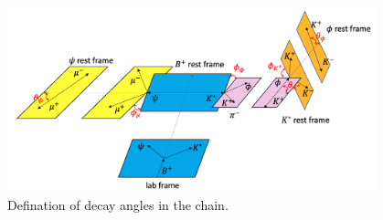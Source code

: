 \begin{figure}[!hbtp]
\centering
\includegraphics[width=0.95\textwidth]{Figures/03_Zcs/05_Likelihood/Cartoon/B2PsiKstar.png}%
\caption{Defination of decay angles in the \Kstar chain.}
\label{fig:cartoon_chain_JpsiKstar}
\end{figure}

